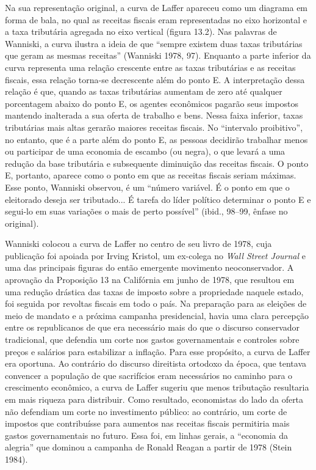 \documentclass[12pt]{article}
\begin{document}
Na sua representação original, a curva de Laffer apareceu como um diagrama em forma de bala, no qual as receitas fiscais eram representadas no eixo horizontal e a taxa tributária agregada no eixo vertical (figura 13.2). Nas palavras de Wanniski, a curva ilustra a ideia de que ``sempre existem duas taxas tributárias que geram as mesmas receitas'' (Wanniski 1978, 97). Enquanto a parte inferior da curva representa uma relação crescente entre as taxas tributárias e as receitas fiscais, essa relação torna-se decrescente além do ponto E. A interpretação dessa relação é que, quando as taxas tributárias aumentam de zero até qualquer porcentagem abaixo do ponto E, os agentes econômicos pagarão seus impostos mantendo inalterada a sua oferta de trabalho e bens. Nessa faixa inferior, taxas tributárias mais altas gerarão maiores receitas fiscais. No ``intervalo proibitivo'', no entanto, que é a parte além do ponto E, as pessoas decidirão trabalhar menos ou participar de uma economia de escambo (ou negra), o que levará a uma redução da base tributária e subsequente diminuição das receitas fiscais. O ponto E, portanto, aparece como o ponto em que as receitas fiscais seriam máximas. Esse ponto, Wanniski observou, é um ``número variável. É o ponto em que o eleitorado deseja ser tributado... É tarefa do líder político determinar o ponto E e segui-lo em suas variações o mais de perto possível'' (ibid., 98–99, ênfase no original).

Wanniski colocou a curva de Laffer no centro de seu livro de 1978, cuja publicação foi apoiada por Irving Kristol, um ex-colega no \textit{Wall Street Journal} e uma das principais figuras do então emergente movimento neoconservador. A aprovação da Proposição 13 na Califórnia em junho de 1978, que resultou em uma redução drástica das taxas de imposto sobre a propriedade naquele estado, foi seguida por revoltas fiscais em todo o país. Na preparação para as eleições de meio de mandato e a próxima campanha presidencial, havia uma clara percepção entre os republicanos de que era necessário mais do que o discurso conservador tradicional, que defendia um corte nos gastos governamentais e controles sobre preços e salários para estabilizar a inflação. Para esse propósito, a curva de Laffer era oportuna. Ao contrário do discurso direitista ortodoxo da época, que tentava convencer a população de que sacrifícios eram necessários no caminho para o crescimento econômico, a curva de Laffer sugeriu que menos tributação resultaria em mais riqueza para distribuir. Como resultado, economistas do lado da oferta não defendiam um corte no investimento público: ao contrário, um corte de impostos que contribuísse para aumentos nas receitas fiscais permitiria mais gastos governamentais no futuro. Essa foi, em linhas gerais, a ``economia da alegria'' que dominou a campanha de Ronald Reagan a partir de 1978 (Stein 1984).
\end{document}
